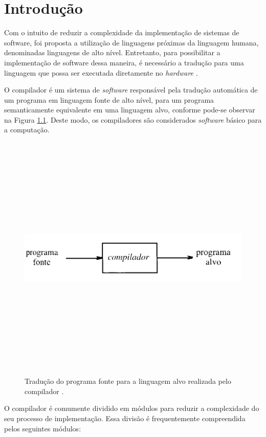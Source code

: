 
\chapter[Introdução]{Introdução}
\label{cap:introducao}



Com o intuito de reduzir a complexidade da implementação de sistemas de software, foi proposta a utilização de linguagens próximas da linguagem humana, denominadas linguagens de alto nível. Entretanto, para possibilitar a implementação de software dessa maneira, é necessário a tradução para uma linguagem que possa ser executada diretamente no \textit{hardware} \cite{aho2007compilers}.

O compilador é um sistema de \textit{software} responsável pela tradução automática de um programa em linguagem fonte de alto nível, para um programa semanticamente equivalente em uma linguagem alvo, conforme pode-se observar na Figura \ref{fig:compiler}. Deste modo, os compiladores são considerados \textit{software} básico para a computação.

\begin{figure}[!h]
\label{fig:compiler}
\centering
\includegraphics[width=12cm,height=12cm,keepaspectratio]{img/compiler.png}
\caption{Tradução do programa fonte para a linguagem alvo realizada pelo compilador \cite{aho2007compilers}.}
\end{figure}

O compilador é comumente dividido em módulos para reduzir a complexidade do seu processo de implementação. Essa divisão é frequentemente compreendida pelos seguintes módulos:

